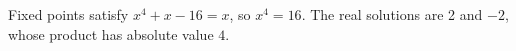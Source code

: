 Fixed points satisfy $x^4+x-16=x$, so $x^4=16$. The real solutions are 2 and $-2$, whose product has absolute value $\boxed4$.
